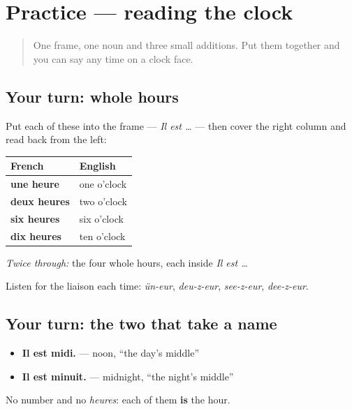 \section[Practice]{Practice — reading the clock}

\label{lesson:FR-C08-practice}



\begin{quote}
One frame, one noun and three small additions. Put them together and you can say any time on a clock face.
\end{quote}

\subsection*{Your turn: whole hours}
Put each of these into the frame — \emph{Il est …} — then cover the right column and read back from the left:

\noindent
\begin{tabularx}{\linewidth}{@{}>{\raggedright\arraybackslash}X>{\raggedright\arraybackslash}X@{}}
\toprule
\textbf{French} & \textbf{English} \\
\midrule
\textbf{une heure} & one o'clock \\
\textbf{deux heures} & two o'clock \\
\textbf{six heures} & six o'clock \\
\textbf{dix heures} & ten o'clock \\
\bottomrule
\end{tabularx}

\emph{Twice through:} the four whole hours, each inside \emph{Il est …}

Listen for the liaison each time: \emph{ün-eur}, \emph{deu-z-eur}, \emph{see-z-eur}, \emph{dee-z-eur}.

\subsection*{Your turn: the two that take a name}
\begin{itemize}
\raggedright
  \item \textbf{Il est midi.} — noon, \textquotedblleft{}the day's middle\textquotedblright{}
  \item \textbf{Il est minuit.} — midnight, \textquotedblleft{}the night's middle\textquotedblright{}
\end{itemize}

No number and no \emph{heures}: each of them \textbf{is} the hour.

